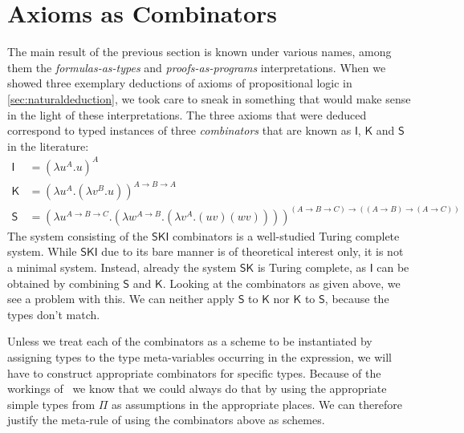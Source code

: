 \section{Axioms as Combinators}
\label{section:ski}

The main result of the previous section is known under various names, among them
the \textit{formulas-as-types} and \textit{proofs-as-programs} interpretations.
When we showed three exemplary deductions of axioms of propositional logic in
\ref{sec:naturaldeduction}, we took care to sneak in something that would make
sense in the light of these interpretations. The three axioms that were deduced
correspond to typed instances of three \textit{combinators} that are known as
$\mathsf{I}$, $\mathsf{K}$ and $\mathsf{S}$ in the literature:
\begin{align*}
\mathsf{I} &=
  (\lambda u^A.u)^A \\
\mathsf{K} &=
  (\lambda u^A.
     (\lambda v^B.u)
  )^{A \to B \to A} \\
\mathsf{S} &=
  (\lambda u^{A \to B \to C}.
     (\lambda w^{A \to B}.
       (\lambda v^A.(uv)(wv))
     )
  )^{(A \to B \to C) \to ((A \to B) \to (A \to C))}
\end{align*}
The system consisting of the $\mathsf{SKI}$ combinators is a well-studied Turing
complete system. While $\mathsf{SKI}$ due to its bare manner is of theoretical
interest only, it is not a minimal system. Instead, already the system
$\mathsf{SK}$ is Turing complete, as $\mathsf{I}$ can be obtained by combining
$\mathsf{S}$ and $\mathsf{K}$. Looking at the combinators as given above, we see
a problem with this. We can neither apply $\mathsf{S}$ to $\mathsf{K}$ nor
$\mathsf{K}$ to $\mathsf{S}$, because the types don't match.

Unless we treat each of the combinators as a scheme to be instantiated by
assigning types to the type meta-variables occurring in the expression, we will
have to construct appropriate combinators for specific types. Because of the
workings of \implnpi\ we know that we could always do that by using the
appropriate simple types from $\Pi$ as assumptions in the appropriate places. We
can therefore justify the meta-rule of using the combinators above as schemes.

